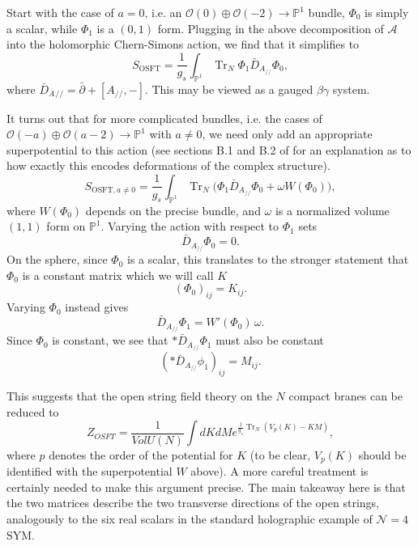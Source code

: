 \documentclass[english]{article}
\DeclareMathOperator{\Tr}{Tr}
\let\mc=\mathcal
\let\mb=\mathbb
\begin{document}
Start with the case of $a=0$, i.e. an $ \mc{O}(0) \oplus \mc{O}(-2) \rightarrow \mathbb{P}^1$ bundle, $\Phi_0$ is simply a scalar, while $\Phi_1$ is a $(0,1)$ form. Plugging in the above decomposition of $\mc{A}$ into the holomorphic Chern-Simons action, we find that it simplifies to
\begin{equation}
    S_{\text{OSFT}} = \frac{1}{g_s} \int_{\mb{P}^1} \Tr_{N} \Phi_1 \bar{D}_{A_{//}} \Phi_0,
\end{equation}
where $\bar{D}_A{_{//}} = \bar{\partial} + [A_{//},-]$. This may be viewed as a gauged $\beta \gamma$ system. 

It turns out that for more complicated bundles, i.e. the cases of $ \mc{O}(-a) \oplus \mc{O}(a-2) \rightarrow \mathbb{P}^1$ with $a \neq 0$, we need only add an appropriate superpotential to this action (see sections B.1 and B.2 of \cite{SuperpotforCS} for an explanation as to how exactly this encodes deformations of the complex structure). 
\begin{equation}
 S_{\text{OSFT},a\neq 0} =  \frac{1}{g_s} \int_{\mb{P}^1}  \Tr_{N} \big(\Phi_1 \bar{D}_{A_{//}} \Phi_0+ \omega  W(\Phi_0)  \big),
\end{equation}
where $W(\Phi_0)$ depends on the precise bundle, and $ \omega$ is a normalized volume $(1,1)$ form on $\mb{P}^1$. Varying the action with respect to $\Phi_1$ sets 
\begin{equation}
     \bar{D}_{A_{//}}\Phi_0=0.
\end{equation}
On the sphere, since $\Phi_0$ is a scalar, this translates to the stronger statement that $\Phi_0$ is a constant matrix which we will call $K$ 
\begin{equation}
    (\Phi_0)_{ij} = K_{ij}.
\end{equation}
Varying $\Phi_0$ instead gives 
\begin{equation}
    \bar{D}_{A_{//}} \Phi_1 = W'(\Phi_0)\, \omega .
\end{equation}
Since $\Phi_0$ is constant, we see that  $ * \bar{D}_{A_{//}} \Phi_1 $ must also be constant
\begin{equation}
    (* \bar{D}_{A_{//}} \phi_1)_{ij} = M_{ij}.
\end{equation}

This suggests that the open string field theory on the $N$ compact branes can be reduced to  
\begin{equation}
   Z_{OSFT} = \frac{1}{Vol U(N)}\int dK dM e^{\frac{1}{g_s} \Tr_{N} \left( V_p(K)-K M \right) },
\end{equation}
where $p$ denotes the order of the potential for $K$ (to be clear, $V_p(K)$ should be identified with the superpotential $W$ above). A more careful treatment is certainly needed to make this argument precise. The main takeaway here is that the two matrices describe the two transverse directions of the open strings, analogously to the six real scalars in the standard holographic example of $\mc{N}=4$ SYM.
\end{document}
